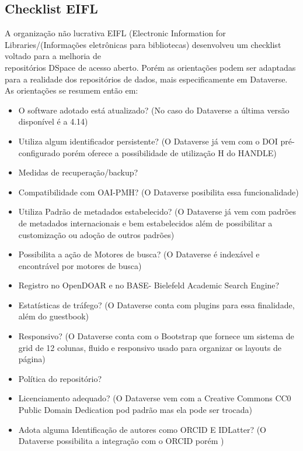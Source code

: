 \documentclass[12pt,hidelinks]{article}
\begin{document}
\subsection{Checklist EIFL}

\qquad A organização não lucrativa EIFL (Electronic Information for Libraries/(Informações eletrônicas para bibliotecas) desenvolveu um checklist voltado para a melhoria de \\repositórios DSpace de acesso aberto. Porém as orientações podem ser adaptadas para a realidade dos repositórios de dados, mais especificamente em Dataverse. As orientações se resumem então em:

\begin{itemize}

    \item O software adotado está atualizado? (No caso do Dataverse a última versão disponível é a 4.14)
    \item Utiliza algum identificador persistente? (O Dataverse  já vem com o DOI pré-configurado porém oferece a possibilidade de utilização H do HANDLE)
    \item Medidas de recuperação/backup?
    \item Compatibilidade com OAI-PMH? (O Dataverse posibilita essa funcionalidade)
    \item Utiliza Padrão de metadados estabelecido? (O Dataverse já vem com padrões de metadados internacionais e bem estabelecidos além de possibilitar a customização ou adoção de outros padrões)
    \item Possibilita a ação de Motores de busca? (O Dataverse é indexável e encontrável por motores de busca)
    \item  Registro no OpenDOAR e no BASE- Bielefeld Academic Search Engine?
    \item Estatísticas de tráfego? (O Dataverse conta com plugins para essa finalidade, além do guestbook)
    \item Responsivo? (O Dataverse conta com o Bootstrap que fornece um sistema de grid de 12 colunas, fluido e responsivo usado para organizar os layouts de página)
    \item Política do repositório?
    \item Licenciamento adequado? (O Dataverse vem com a Creative Commons CC0 Public Domain Dedication pod padrão mas ela pode ser trocada)
    \item Adota alguma Identificação de autores como ORCID E IDLatter? (O Dataverse possibilita a integração com o ORCID porém )

\end{itemize}
\end{document}
